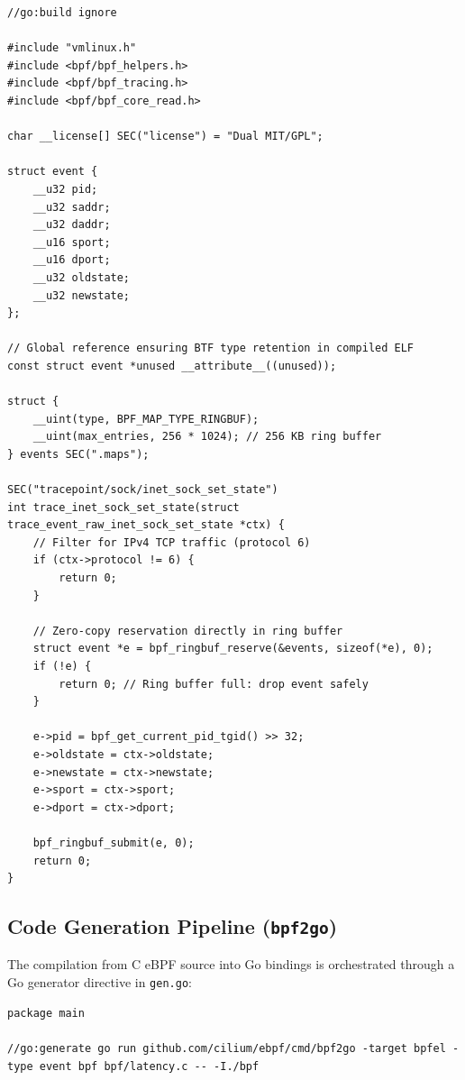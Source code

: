 \documentclass[11pt,a4paper]{article}
\begin{document}
\begin{lstlisting}[style=cstyle, caption={Core Kernel eBPF Logic (\texttt{bpf/latency.c})}]
//go:build ignore

#include "vmlinux.h"
#include <bpf/bpf_helpers.h>
#include <bpf/bpf_tracing.h>
#include <bpf/bpf_core_read.h>

char __license[] SEC("license") = "Dual MIT/GPL";

struct event {
    __u32 pid;
    __u32 saddr;
    __u32 daddr;
    __u16 sport;
    __u16 dport;
    __u32 oldstate;
    __u32 newstate;
};

// Global reference ensuring BTF type retention in compiled ELF
const struct event *unused __attribute__((unused));

struct {
    __uint(type, BPF_MAP_TYPE_RINGBUF);
    __uint(max_entries, 256 * 1024); // 256 KB ring buffer
} events SEC(".maps");

SEC("tracepoint/sock/inet_sock_set_state")
int trace_inet_sock_set_state(struct trace_event_raw_inet_sock_set_state *ctx) {
    // Filter for IPv4 TCP traffic (protocol 6)
    if (ctx->protocol != 6) {
        return 0;
    }

    // Zero-copy reservation directly in ring buffer
    struct event *e = bpf_ringbuf_reserve(&events, sizeof(*e), 0);
    if (!e) {
        return 0; // Ring buffer full: drop event safely
    }

    e->pid = bpf_get_current_pid_tgid() >> 32;
    e->oldstate = ctx->oldstate;
    e->newstate = ctx->newstate;
    e->sport = ctx->sport;
    e->dport = ctx->dport;

    bpf_ringbuf_submit(e, 0);
    return 0;
}
\end{lstlisting}

\subsection{Code Generation Pipeline (\texttt{bpf2go})}
The compilation from C eBPF source into Go bindings is orchestrated through a Go generator directive in \texttt{gen.go}:

\begin{lstlisting}[style=gostyle, caption={\texttt{gen.go} Build Directive}]
package main

//go:generate go run github.com/cilium/ebpf/cmd/bpf2go -target bpfel -type event bpf bpf/latency.c -- -I./bpf
\end{lstlisting}
\end{document}
